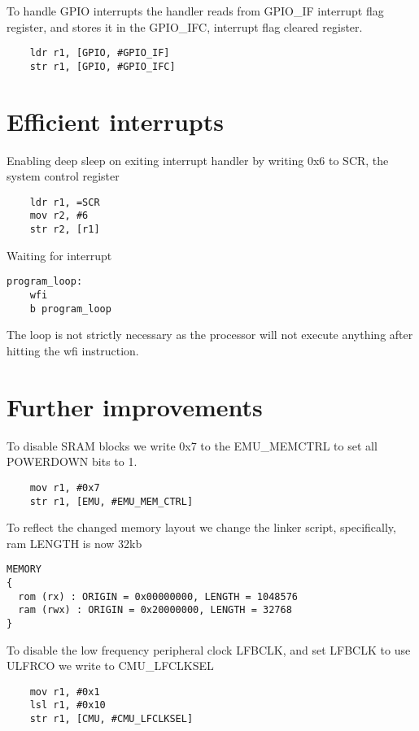 To handle GPIO interrupts the handler reads from GPIO\_IF interrupt flag register, and stores it in the GPIO\_IFC, interrupt flag cleared register.

\begin{lstlisting}
	ldr r1, [GPIO, #GPIO_IF]	
	str r1, [GPIO, #GPIO_IFC]	
\end{lstlisting}


\section{Efficient interrupts}

Enabling deep sleep on exiting interrupt handler by writing 0x6 to SCR, the system control register 

\begin{lstlisting}
	ldr r1, =SCR
	mov r2, #6
	str r2, [r1]	
\end{lstlisting}

Waiting for interrupt

\begin{lstlisting}
program_loop:
 	wfi
	b program_loop  	
\end{lstlisting}

The loop is not strictly necessary as the processor will not execute anything after hitting the wfi instruction.

\section{Further improvements}

To disable SRAM blocks we write 0x7 to the EMU\_MEMCTRL to set all POWERDOWN bits to 1.

\begin{lstlisting}
	mov r1, #0x7
	str r1, [EMU, #EMU_MEM_CTRL]
\end{lstlisting}

To reflect the changed memory layout we change the linker script, specifically, ram LENGTH is now 32kb

\begin{lstlisting}
MEMORY
{
  rom (rx) : ORIGIN = 0x00000000, LENGTH = 1048576
  ram (rwx) : ORIGIN = 0x20000000, LENGTH = 32768
}
\end{lstlisting}

To disable the low frequency peripheral clock LFBCLK, and set LFBCLK to use ULFRCO we write to CMU\_LFCLKSEL

\begin{lstlisting}
	mov r1, #0x1
	lsl r1, #0x10
	str r1, [CMU, #CMU_LFCLKSEL]
\end{lstlisting}

